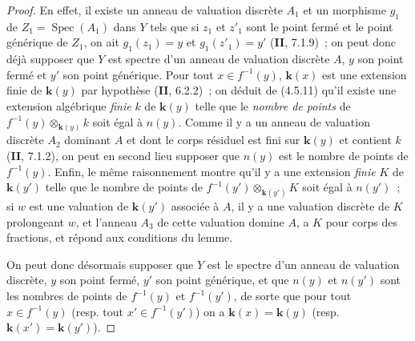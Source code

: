 \begin{proof}
En effet, il existe un anneau de valuation discrète $A_1$ et un morphisme $g_1$ de $Z_1=\operatorname{Spec}(A_1)$ dans $Y$ tels que si $z_1$ et $z'_1$ sont le point fermé et le point générique de $Z_1$,
on ait $g_1(z_1)=y$ et $g_1(z'_1)=y'$ (\textbf{II}, 7.1.9)~; on peut donc déjà supposer que $Y$ est spectre d'un anneau de valuation discrète $A$, $y$ son point fermé et $y'$ son point générique. Pour tout $x\in f^{-1}(y)$, $\boldsymbol{k}(x)$ est une extension finie de $\boldsymbol{k}(y)$ par hypothèse (\textbf{II}, 6.2.2)~; on déduit de (4.5.11) qu'il existe une extension algébrique \emph{finie} $k$ de $\boldsymbol{k}(y)$ telle que le \emph{nombre de points} de $f^{-1}(y)\otimes_{\mathbf{k}(y)}k$ soit égal à $n(y)$. Comme il y a un anneau de valuation discrète $A_2$ dominant $A$ et dont le corps résiduel est fini sur $\boldsymbol{k}(y)$ et contient $k$ (\textbf{II}, 7.1.2), on peut en second lieu supposer que $n(y)$ est le nombre de points de $f^{-1}(y)$. Enfin, le même raisonnement montre qu'il y a une extension \emph{finie} $K$ de $\boldsymbol{k}(y')$ telle que le nombre de points de $f^{-1}(y')\otimes_{\mathbf{k}(y')}K$ soit égal à $n(y')$~; si $w$ est une valuation de $\boldsymbol{k}(y')$ associée à $A$, il y a une valuation discrète de $K$ prolongeant $w$, et l'anneau $A_3$ de cette valuation domine $A$, a $K$ pour corps des fractions, et répond aux conditions du lemme.

On peut donc désormais supposer que $Y$ est le spectre d'un anneau de valuation discrète, $y$ son point fermé, $y'$ son point générique, et que $n(y)$ et $n(y')$ sont les nombres de points de $f^{-1}(y)$ et $f^{-1}(y')$, de sorte que pour tout $x\in f^{-1}(y)$ (resp. tout $x'\in f^{-1}(y')$) on a $\boldsymbol{k}(x)=\boldsymbol{k}(y)$ (resp. $\boldsymbol{k}(x')=\boldsymbol{k}(y')$).


\end{proof}
